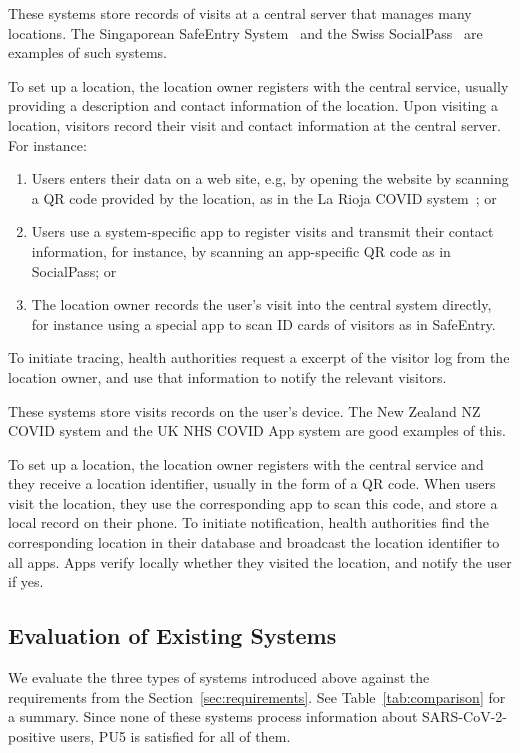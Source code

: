  These systems store records of visits at a central server that manages many locations. The Singaporean SafeEntry System~\cite{safeentry} and the Swiss SocialPass~\cite{socialpass} are examples of such systems.

To set up a location, the location owner registers with the central service, usually providing a description and contact information of the location. Upon visiting a location, visitors record their visit and contact information at the central server. For instance:
\begin{enumerate}[topsep=0pt, partopsep=0pt]
\item Users enters their data on a web site, e.g, by opening the website by scanning a QR code provided by the location, as in the La Rioja COVID system~\cite{larioja}; or
\item Users use a system-specific app to register visits and transmit their contact information, for instance, by scanning an app-specific QR code as in SocialPass; or
\item The location owner records the user's visit into the central system directly, for instance using a special app to scan ID cards of visitors as in SafeEntry.
\end{enumerate}
To initiate tracing, health authorities request a excerpt of the visitor log from the location owner, and use that information to notify the relevant visitors.

 These systems store visits records on the user's device. The New Zealand NZ COVID system and the UK NHS COVID App system are good examples of this.

To set up a location, the location owner registers with the central service and they receive a location identifier, usually in the form of a QR code. When users visit the location, they use the corresponding app to scan this code, and store a local record on their phone. To initiate notification, health authorities find the corresponding location in their database and broadcast the location identifier to all apps. Apps verify locally whether they visited the location, and notify the user if yes.





\subsection{Evaluation of Existing Systems}
\label{sec:evaluation-existing}
We evaluate the three types of systems introduced above against the requirements
from the Section~\ref{sec:requirements}. See Table~\ref{tab:comparison} for a summary. Since none of these systems process information about SARS-CoV-2-positive users, PU5 is satisfied for all of them.

